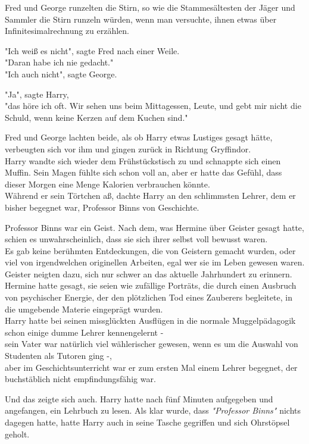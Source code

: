 {Fred und George runzelten die Stirn, so wie die Stammesältesten der Jäger und Sammler die Stirn runzeln würden, wenn man versuchte, ihnen etwas über Infinitesimalrechnung zu erzählen.

"Ich weiß es nicht", sagte Fred nach einer Weile.\\ "Daran habe ich nie gedacht."\\ "Ich auch nicht", sagte George.

"Ja", sagte Harry,\\ "das höre ich oft. Wir sehen uns beim Mittagessen, Leute, und gebt mir nicht die Schuld, wenn keine Kerzen auf dem Kuchen sind."

Fred und George lachten beide, als ob Harry etwas Lustiges gesagt hätte, verbeugten sich vor ihm und gingen zurück in Richtung Gryffindor.\\ Harry wandte sich wieder dem Frühstückstisch zu und schnappte sich einen Muffin. Sein Magen fühlte sich schon voll an, aber er hatte das Gefühl, dass dieser Morgen eine Menge Kalorien verbrauchen könnte.\\ Während er sein Törtchen aß, dachte Harry an den schlimmsten Lehrer, dem er bisher begegnet war, Professor Binns von Geschichte.

Professor Binns war ein Geist. Nach dem, was Hermine über Geister gesagt hatte, schien es unwahrscheinlich, dass sie sich ihrer selbst voll bewusst waren.\\ Es gab keine berühmten Entdeckungen, die von Geistern gemacht wurden, oder viel von irgendwelchen originellen Arbeiten, egal wer sie im Leben gewesen waren.\\ Geister neigten dazu, sich nur schwer an das aktuelle Jahrhundert zu erinnern. Hermine hatte gesagt, sie seien wie zufällige Porträts, die durch einen Ausbruch von psychischer Energie, der den plötzlichen Tod eines Zauberers begleitete, in die umgebende Materie eingeprägt wurden.\\ Harry hatte bei seinen missglückten Ausflügen in die normale Muggelpädagogik schon einige dumme Lehrer kennengelernt -\\ sein Vater war natürlich viel wählerischer gewesen, wenn es um die Auswahl von Studenten als Tutoren ging -,\\ aber im Geschichtsunterricht war er zum ersten Mal einem Lehrer begegnet, der buchstäblich nicht empfindungsfähig war.

Und das zeigte sich auch. Harry hatte nach fünf Minuten aufgegeben und angefangen, ein Lehrbuch zu lesen. Als klar wurde, dass \emph{"Professor Binns"} nichts dagegen hatte, hatte Harry auch in seine Tasche gegriffen und sich Ohrstöpsel geholt.

}
